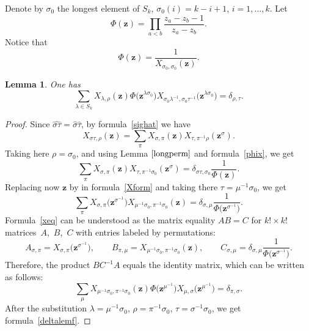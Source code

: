 \documentclass[pdftex]{sigma}
\numberwithin{equation}{section}
\newtheorem{Lemma}[Theorem]{Lemma}
\begin{document}
Denote by $\sigma_0$ the longest element of $S_k$, $\sigma_0(i)=k-i+1$, $i=1,\dots,k$. Let
\begin{equation*}
\Phi(\boldsymbol{z})=\prod_{a<b}\frac{z_a-z_b-1}{z_a-z_b}.
\end{equation*}
Notice that
\begin{equation}\label{phix}
\Phi(\boldsymbol{z})=\frac{1}{X_{\sigma_0,\sigma_0}(\boldsymbol{z})}.
\end{equation}
\begin{Lemma}\label{deltalem}One has
\begin{equation} \label{deltalemf}
\sum_{\lambda\in S_k} X_{\lambda,\rho}(\boldsymbol{z})\Phi\bigl(\boldsymbol{z}^{\lambda\sigma_0}\bigr)X_{\sigma_0\lambda^{-1},\sigma_0\tau^{-1}}\bigl(\boldsymbol{z}^{\lambda\sigma_0}\bigr)=\delta_{\rho,\tau}.
\end{equation}
\end{Lemma}
\begin{proof}
Since $\widehat{\sigma\tau} =\hat{\sigma}\hat{\tau}$, by formula~\eqref{sighat} we have
\begin{equation}\label{prodx}
X_{\sigma\tau,\rho}(\boldsymbol{z})=\sum_\pi X_{\sigma,\pi}(\boldsymbol{z})X_{\tau,\pi^{-1}\rho}(\boldsymbol{z}^\sigma).
\end{equation}
Taking here $\rho=\sigma_0$, and using Lemma $\ref{longperm}$ and formula~\eqref{phix}, we get
\begin{equation}\label{Xform}
\sum_\pi X_{\sigma,\pi}(\boldsymbol{z})X_{\tau,\pi^{-1}\sigma_0}(\boldsymbol{z}^\sigma)=\delta_{\sigma\tau,\sigma_0} \frac{1}{\Phi(\boldsymbol{z})}.
\end{equation}
Replacing now $\boldsymbol{z}$ by  in formula~\eqref{Xform} and taking there $\tau=\mu^{-1}\sigma_0$, we get
\begin{equation}\label{xeq}
\sum_\pi X_{\sigma,\pi}\bigl(\boldsymbol{z}^{\sigma^{-1}}\bigr)X_{\mu^{-1}\sigma_0,\pi^{-1}\sigma_0}(\boldsymbol{z} )=\delta_{\sigma,\mu} \frac{1}{\Phi\bigl(\boldsymbol{z}^{\sigma^{-1}}\bigr)}.
\end{equation}
Formula~\eqref{xeq} can be understood as the matrix equality $AB=C$ for
$k!\times k!$ matrices~$A$,~$B$,~$C$ with entries labeled by permutations:
\begin{equation*}
A_{\sigma,\pi}=X_{\sigma,\pi}\bigl(\boldsymbol{z}^{\sigma^{-1}}\bigr),\qquad B_{\pi,\mu}=X_{\mu^{-1}\sigma_0,\pi^{-1}\sigma_0}(\boldsymbol{z}),\qquad C_{\sigma,\mu}= \delta_{\sigma,\mu} \frac{1}{\Phi\bigl(\boldsymbol{z}^{\sigma^{-1}}\bigr)}.
\end{equation*}
Therefore, the product $BC^{-1}A$ equals the identity matrix, which can be written as follows:
\begin{equation*}
\sum_{\mu} X_{\mu^{-1}\sigma_0,\pi^{-1}\sigma_0}(\boldsymbol{z})\Phi\bigl(\boldsymbol{z}^{\mu^{-1}}\bigr)X_{\mu,\sigma}\bigl(\boldsymbol{z}^{\mu^{-1}}\bigr)=\delta_{\pi,\sigma}.
\end{equation*}
After the substitution
$\lambda=\mu^{-1}\sigma_0$, $\rho=\pi^{-1}\sigma_0$, $\tau=\sigma^{-1}\sigma_0$, we get formula~\eqref{deltalemf}.
\end{proof}
\end{document}
